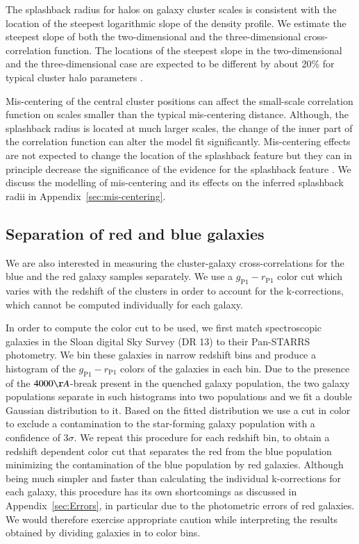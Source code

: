 \documentclass[iop, apjl, twocolappendix, numberedappendix]{emulateapj}
\begin{document}
The splashback radius for halos on galaxy cluster scales is consistent
with the location of the steepest logarithmic slope of the density
profile. We estimate the steepest slope of both the two-dimensional
and the three-dimensional cross-correlation function. The
locations of the steepest slope in the two-dimensional and the
three-dimensional case are expected to be different by
about 20\% for typical cluster halo parameters
\citep{diemer2014dependence, more2016detection}.

Mis-centering of the central cluster positions can affect the
small-scale correlation function on scales smaller than the typical
mis-centering distance.  Although, the splashback radius is located at
much larger scales, the change of the inner part of the correlation
function can alter the model fit significantly.  Mis-centering effects
are not expected to change the location of the splashback feature but
they can in principle decrease the significance of the evidence for
the splashback feature \citep{baxter2017halo}.  We discuss the
modelling of mis-centering and its effects on the inferred splashback
radii in Appendix~\ref{sec:mis-centering}.

\subsection{Separation of red and blue galaxies}
\label{sec:Color}

We are also interested in measuring the cluster-galaxy
cross-correlations for the blue and the red galaxy samples
separately. We use a $g_{\mathrm{P1}}-r_{\mathrm{P1}}$ color cut
which varies with the redshift of the clusters in order to account
for the k-corrections, which cannot be computed individually for
each galaxy.

In order to compute the color cut to be used, we first match spectroscopic
galaxies in the Sloan digital Sky Survey (DR 13) to their
Pan-STARRS photometry. We bin these galaxies in narrow redshift bins and
produce a histogram of the $g_{\mathrm{P1}}-r_{\mathrm{P1}}$ colors of the
galaxies in each bin. Due to the presence of the $4000\AA$-break present in the
quenched galaxy population, the two galaxy populations separate in such histograms
into two populations and we fit a double Gaussian distribution to it.
Based on the fitted distribution we use a cut in color to exclude a
contamination to the star-forming galaxy population with a confidence
of 3$\sigma$. We repeat this procedure for each redshift bin, to obtain a redshift
dependent color cut that separates the red from the blue population minimizing
the contamination of the blue population by red galaxies. Although being much
simpler and faster than calculating the individual k-corrections for each
galaxy, this procedure has its own shortcomings as discussed in
Appendix~\ref{sec:Errors}, in particular due to the photometric errors of red
galaxies. We would therefore exercise appropriate caution while interpreting
the results obtained by dividing galaxies in to color bins.
\end{document}
